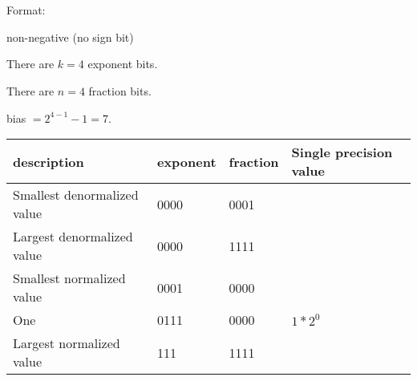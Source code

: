 \documentclass[letterpaper, 11pt]{article}
\theoremstyle{mystyle}
\begin{document}
\section{}
Format:
\begin{compactitem}
    \item non-negative (no sign bit)
    \item There are $k=4$ exponent bits.
    \item There are $n=4$ fraction bits.
    \item bias $= 2^{4-1}-1 = 7 $.
\end{compactitem}

\begin{tabular}{M|M|M|M}
    description                     & exponent  & fraction  & Single precision value \\ \hline
    Smallest denormalized value     & 0000      & 0001      &                        \\
    Largest denormalized value      & 0000      & 1111      &                        \\
    Smallest normalized value       & 0001      & 0000      &                        \\
    One                             & 0111      & 0000      & $1*2^0$                \\
    Largest normalized value        & 111       & 1111      &                        \\
\end{tabular}
\end{document}
